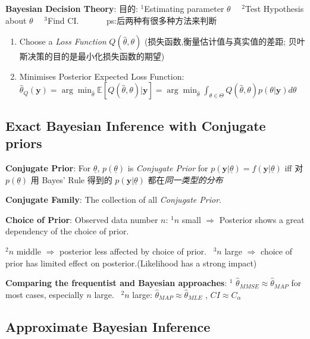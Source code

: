 \documentclass[9pt]{article}
\begin{document}
\textbf{Bayesian Decision Theory}: {\footnotesize 目的: $^1$Estimating parameter $\theta$ \ \ $^2$Test Hypothesis about $\theta$ \ \ $^3$Find CI. \ \ \ \ \ \ {\scriptsize ps:后两种有很多种方法来判断}}

\begin{enumerate}[itemsep=-2pt, topsep=-2pt]
    \item Choose a \textit{Loss Function} $Q(\widehat{\theta},\theta)$ {\scriptsize (损失函数,衡量估计值与真实值的差距; 贝叶斯决策的目的是最小化损失函数的期望)}
    \item Minimises Posterior Expected Loss Function: $\widehat{\theta}_Q(\mathbf{y})=\arg\min_{\widehat{\theta}}\mathbb{E}[Q(\widehat{\theta},\theta)|\mathbf{y}]=\arg\min_{\widehat{\theta}}\int_{\theta\in\Theta}Q(\widehat{\theta},\theta)p(\theta|\mathbf{y})d\theta$
\end{enumerate}


\subsection{Exact Bayesian Inference with Conjugate priors}

\textbf{Conjugate Prior}: {\small For $\underline{\theta}$, $p(\underline{\theta})$ is \textit{Conjugate Prior} for $p(\mathbf{y}|\underline{\theta})=f(\mathbf{y}|\underline{\theta})$ iff {\footnotesize 对 $p(\underline{\theta})$ 用 Bayes' Rule 得到的 $p(\mathbf{y}|\underline{\theta})$ 都在\textit{同一类型的分布}}}

\textbf{Conjugate Family}: The collection of all \textit{Conjugate Prior}.

\textbf{Choice of Prior}: Observed data number $n$: {\footnotesize $^1n$ small $\Rightarrow$ Posterior shows a great dependency of the choice of prior.}

\hspace{70pt} {\footnotesize $^2n$ middle $\Rightarrow$ posterior less affected by choice of prior. \ $^3n$ large $\Rightarrow$ choice of prior has limited effect on posterior.{\scriptsize(Likelihood has a strong impact)}}

\textbf{Comparing the frequentist and Bayesian approaches}: {\footnotesize $^1$ $\widehat{\theta}_{MMSE}\approx\widehat{\theta}_{MAP}$ for most cases, especially $n$ large. \ $^2n$ large: $\widehat{\theta}_{MAP}\approx\widehat{\theta}_{MLE}$ , $CI\approx C_\alpha$}


\subsection{Approximate Bayesian Inference}
\end{document}
